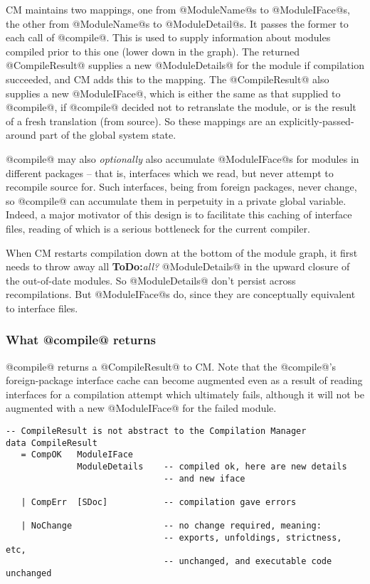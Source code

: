 \documentclass[11pt]{article}
\newcommand{\ToDo}[1]{{{\bf ToDo:}\sl #1}}
\begin{document}
CM maintains two mappings, one from @ModuleName@s to @ModuleIFace@s,
the other from @ModuleName@s to @ModuleDetail@s.  It passes the former
to each call of @compile@.  This is used to supply information about
modules compiled prior to this one (lower down in the graph).  The
returned @CompileResult@ supplies a new @ModuleDetails@ for the module
if compilation succeeded, and CM adds this to the mapping.  The
@CompileResult@ also supplies a new @ModuleIFace@, which is either the
same as that supplied to @compile@, if @compile@ decided not to
retranslate the module, or is the result of a fresh translation (from
source).  So these mappings are an explicitly-passed-around part of
the global system state.

@compile@ may also {\em optionally} also accumulate @ModuleIFace@s for
modules in different packages -- that is, interfaces which we read,
but never attempt to recompile source for.  Such interfaces, being
from foreign packages, never change, so @compile@ can accumulate them
in perpetuity in a private global variable.  Indeed, a major motivator
of this design is to facilitate this caching of interface files,
reading of which is a serious bottleneck for the current compiler.

When CM restarts compilation down at the bottom of the module graph,
it first needs to throw away all \ToDo{all?} @ModuleDetails@ in the
upward closure of the out-of-date modules.  So @ModuleDetails@ don't
persist across recompilations.  But @ModuleIFace@s do, since they
are conceptually equivalent to interface files.


\subsubsection*{What @compile@ returns}
@compile@ returns a @CompileResult@ to CM.
Note that the @compile@'s foreign-package interface cache can
become augmented even as a result of reading interfaces for a
compilation attempt which ultimately fails, although it will not be
augmented with a new @ModuleIFace@ for the failed module.
\begin{verbatim}
-- CompileResult is not abstract to the Compilation Manager
data CompileResult
   = CompOK   ModuleIFace 
              ModuleDetails    -- compiled ok, here are new details
                               -- and new iface

   | CompErr  [SDoc]           -- compilation gave errors

   | NoChange                  -- no change required, meaning:
                               -- exports, unfoldings, strictness, etc,
                               -- unchanged, and executable code unchanged
\end{verbatim}
\end{document}
